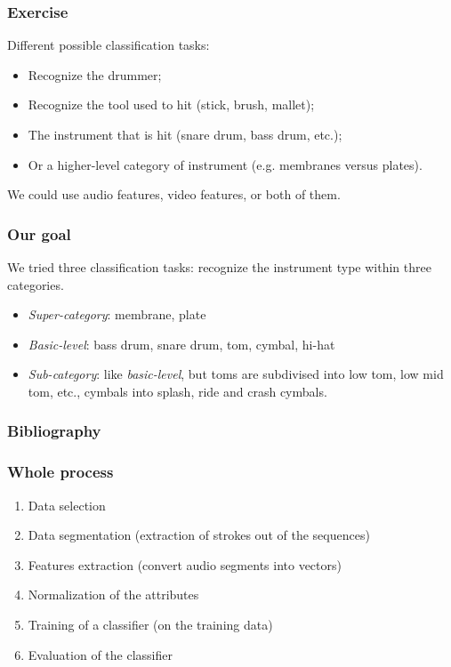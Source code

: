 \documentclass{beamer}
\begin{document}
    \begin{frame}
        \frametitle{Exercise}
        Different possible classification tasks:
        \begin{itemize}
            \item Recognize the drummer;
            \item Recognize the tool used to hit (stick, brush, mallet);
            \item The instrument that is hit (snare drum, bass drum, etc.);
            \item Or a higher-level category of instrument (e.g. membranes versus plates).
        \end{itemize}
        We could use audio features, video features, or both of them.
    \end{frame}
    \begin{frame}
        \frametitle{Our goal}
        We tried three classification tasks: recognize the instrument type within three categories.
        \begin{itemize}
            \item \emph{Super-category}: membrane, plate
            \item \emph{Basic-level}: bass drum, snare drum, tom, cymbal, hi-hat
            \item \emph{Sub-category}: like \emph{basic-level}, but toms are subdivised into low tom, low mid tom, etc., cymbals into splash, ride and crash cymbals.
        \end{itemize}
    \end{frame}
    \begin{frame}
        \frametitle{Bibliography}
        \footnotesize 
        \nocite{*}
        
        
        \normalsize
    \end{frame}
    \begin{frame}
        \frametitle{Whole process}
        \begin{enumerate}
            \item Data selection
            \item Data segmentation (extraction of strokes out of the sequences)
            \item Features extraction (convert audio segments into vectors)
            \item Normalization of the attributes
            \item Training of a classifier (on the training data)
            \item Evaluation of the classifier
        \end{enumerate}
    \end{frame}
    
\end{document}
